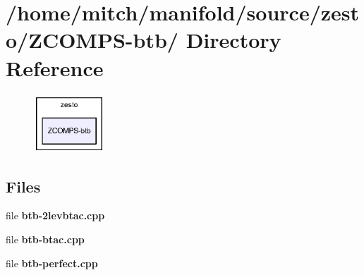 \section{/home/mitch/manifold/source/zesto/ZCOMPS-btb/ Directory Reference}
\label{dir_55e468a4191b773da8faa79103d39a95}


\nopagebreak
\begin{figure}[H]
\begin{center}
\leavevmode
\includegraphics[width=75pt]{dir_55e468a4191b773da8faa79103d39a95_dep}
\end{center}
\end{figure}
\subsection*{Files}
\begin{CompactItemize}
\item 
file {\bf btb-2levbtac.cpp}
\item 
file {\bf btb-btac.cpp}
\item 
file {\bf btb-perfect.cpp}
\end{CompactItemize}

